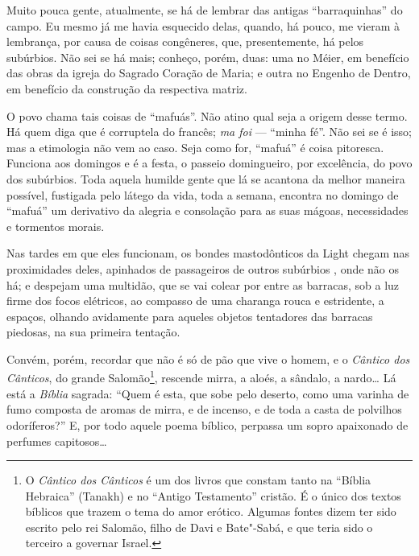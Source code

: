 Muito pouca gente, atualmente, se há de lembrar das antigas
``barraquinhas'' do campo. Eu mesmo já me havia esquecido delas, quando,
há pouco, me vieram à lembrança, por causa de coisas congêneres, que,
presentemente, há pelos subúrbios. Não sei se há mais; conheço, porém,
duas: uma no Méier, em benefício das obras da igreja do Sagrado Coração
de Maria; e outra no Engenho de Dentro, em benefício da construção da
respectiva matriz.

O povo chama tais coisas de ``mafuás''. Não atino qual seja a origem
desse termo. Há quem diga que é corruptela do francês; \emph{ma foi} ---
``minha fé''. Não sei se é isso; mas a etimologia não vem ao caso. Seja
como for, ``mafuá'' é coisa pitoresca. Funciona aos domingos e é a
festa, o passeio domingueiro, por excelência, do povo dos subúrbios.
Toda aquela humilde gente que lá se acantona da melhor maneira possível,
fustigada pelo látego da vida, toda a semana, encontra no domingo de
``mafuá'' um derivativo da alegria e consolação para as suas mágoas,
necessidades e tormentos morais.

Nas tardes em que eles funcionam, os bondes mastodônticos da Light
chegam nas proximidades deles, apinhados de passageiros de outros
subúrbios , onde não os há; e despejam uma multidão, que se vai colear
por entre as barracas, sob a luz firme dos focos elétricos, ao compasso
de uma charanga rouca e estridente, a espaços, olhando avidamente para
aqueles objetos tentadores das barracas piedosas, na sua primeira
tentação.


Convém, porém, recordar que não é só de pão que vive o homem, e o
\emph{Cântico dos Cânticos}, do
grande Salomão\footnote{O \emph{Cântico dos Cânticos} é um dos livros
  que constam tanto na ``Bíblia Hebraica'' (Tanakh) e no ``Antigo
  Testamento'' cristão. É o único dos textos bíblicos que trazem o tema
  do amor erótico. Algumas fontes dizem ter sido escrito pelo rei
  Salomão, filho de Davi e Bate"-Sabá, e que teria sido o terceiro a
  governar Israel.}, rescende mirra, a aloés, a sândalo, a nardo\ldots{} Lá
está a \emph{Bíblia} sagrada: ``Quem é esta, que sobe pelo deserto, como
uma varinha de fumo composta de aromas de mirra, e de incenso, e de toda
a casta de polvilhos odoríferos?'' E, por todo aquele poema bíblico,
perpassa um sopro apaixonado de perfumes capitosos\ldots{}

